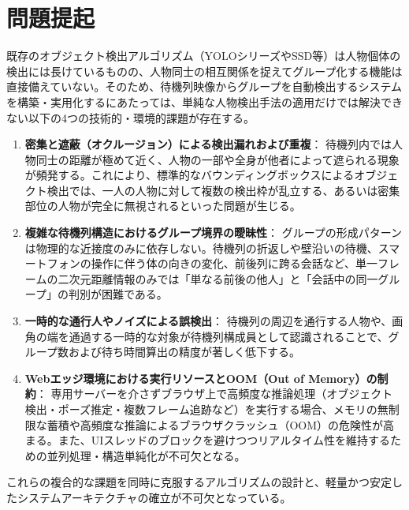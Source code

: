 \section{問題提起}

既存のオブジェクト検出アルゴリズム（YOLOシリーズやSSD等）は人物個体の検出には長けているものの、人物同士の相互関係を捉えてグループ化する機能は直接備えていない。そのため、待機列映像からグループを自動検出するシステムを構築・実用化するにあたっては、単純な人物検出手法の適用だけでは解決できない以下の4つの技術的・環境的課題が存在する。

\begin{enumerate}
    \item \textbf{密集と遮蔽（オクルージョン）による検出漏れおよび重複}：
    待機列内では人物同士の距離が極めて近く、人物の一部や全身が他者によって遮られる現象が頻発する。これにより、標準的なバウンディングボックスによるオブジェクト検出では、一人の人物に対して複数の検出枠が乱立する、あるいは密集部位の人物が完全に無視されるといった問題が生じる。

    \item \textbf{複雑な待機列構造におけるグループ境界の曖昧性}：
    グループの形成パターンは物理的な近接度のみに依存しない。待機列の折返しや壁沿いの待機、スマートフォンの操作に伴う体の向きの変化、前後列に跨る会話など、単一フレームの二次元距離情報のみでは「単なる前後の他人」と「会話中の同一グループ」の判別が困難である。

    \item \textbf{一時的な通行人やノイズによる誤検出}：
    待機列の周辺を通行する人物や、画角の端を通過する一時的な対象が待機列構成員として認識されることで、グループ数および待ち時間算出の精度が著しく低下する。

    \item \textbf{Webエッジ環境における実行リソースとOOM（Out of Memory）の制約}：
    専用サーバーを介さずブラウザ上で高頻度な推論処理（オブジェクト検出・ポーズ推定・複数フレーム追跡など）を実行する場合、メモリの無制限な蓄積や高頻度な推論によるブラウザクラッシュ（OOM）の危険性が高まる。また、UIスレッドのブロックを避けつつリアルタイム性を維持するための並列処理・構造単純化が不可欠となる。
\end{enumerate}

これらの複合的な課題を同時に克服するアルゴリズムの設計と、軽量かつ安定したシステムアーキテクチャの確立が不可欠となっている。
